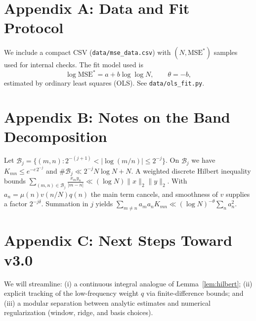 
\section{Appendix A: Data and Fit Protocol}
We include a compact CSV (\texttt{data/mse_data.csv}) with $(N,\mathrm{MSE}^\ast)$ samples used for internal checks.
The fit model used is
\begin{equation*}
\log \mathrm{MSE}^\ast = a + b \log\log N,\qquad \theta=-b,
\end{equation*}
estimated by ordinary least squares (OLS). See \texttt{data/ols_fit.py}.

\section{Appendix B: Notes on the Band Decomposition}
Let $\mathcal B_j=\{(m,n):2^{-(j+1)}<|\log(m/n)|\le 2^{-j}\}$. On $\mathcal B_j$ we have
$K_{mn}\le e^{-c\,2^{-j}}$ and $\#\mathcal B_j\ll 2^{-j}N\log N + N$.
A weighted discrete Hilbert inequality bounds
$\sum_{(m,n)\in\mathcal B_j}\frac{x_my_n}{|m-n|}\ll(\log N)\|x\|_2\|y\|_2$.
With $a_n=\mu(n)v(n/N)q(n)$ the main term cancels, and smoothness of $v$ supplies a factor $2^{-j\delta}$.
Summation in $j$ yields $\sum_{m\ne n}a_ma_nK_{mn}\ll (\log N)^{-\theta}\sum_n a_n^2$.

\section{Appendix C: Next Steps Toward v3.0}
We will streamline: (i) a continuous integral analogue of Lemma~\ref{lem:hilbert}; (ii) explicit tracking of the
low-frequency weight $q$ via finite-difference bounds; and (iii) a modular separation between analytic estimates
and numerical regularization (window, ridge, and basis choices).
